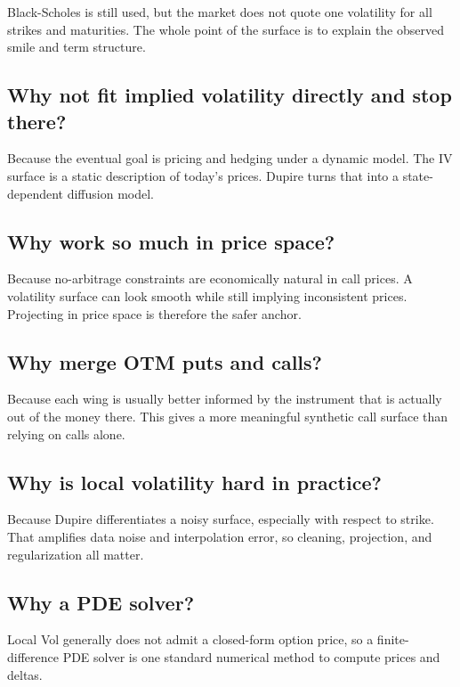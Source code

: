 \documentclass[11pt]{article}
\begin{document}
Black-Scholes is still used, but the market does not quote one volatility for all strikes and maturities. The whole point of the surface is to explain the observed smile and term structure.

\subsection*{Why not fit implied volatility directly and stop there?}

Because the eventual goal is pricing and hedging under a dynamic model. The IV surface is a static description of today's prices. Dupire turns that into a state-dependent diffusion model.

\subsection*{Why work so much in price space?}

Because no-arbitrage constraints are economically natural in call prices. A volatility surface can look smooth while still implying inconsistent prices. Projecting in price space is therefore the safer anchor.

\subsection*{Why merge OTM puts and calls?}

Because each wing is usually better informed by the instrument that is actually out of the money there. This gives a more meaningful synthetic call surface than relying on calls alone.

\subsection*{Why is local volatility hard in practice?}

Because Dupire differentiates a noisy surface, especially with respect to strike. That amplifies data noise and interpolation error, so cleaning, projection, and regularization all matter.

\subsection*{Why a PDE solver?}

Local Vol generally does not admit a closed-form option price, so a finite-difference PDE solver is one standard numerical method to compute prices and deltas.
\end{document}
